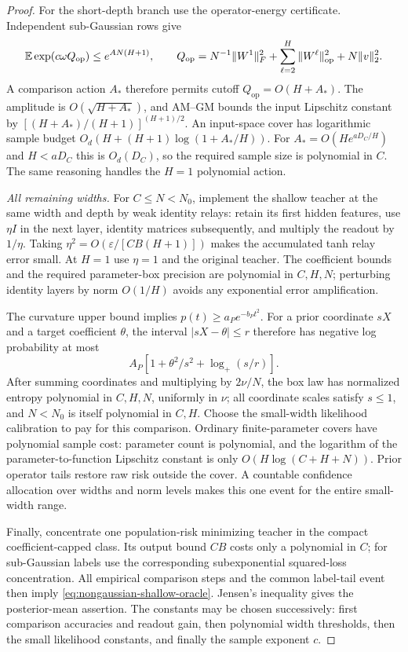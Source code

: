 \begin{proof}
For the short-depth branch use the operator-energy certificate.
Independent sub-Gaussian rows give
\[
 \mathbb E\exp(c\omega Q_{\mathrm{op}})\le e^{AN(H+1)},\qquad
 Q_{\mathrm{op}}=N^{-1}\|W^1\|_F^2
     +\sum_{\ell=2}^H\|W^\ell\|_{\mathrm{op}}^2
     +N\|v\|_2^2.
\]
A comparison action $A_*$ therefore permits cutoff
$Q_{\mathrm{op}}=O(H+A_*)$.
The amplitude is $O(\sqrt{H+A_*})$, and AM--GM bounds the input
Lipschitz constant by
$[(H+A_*)/(H+1)]^{(H+1)/2}$.
An input-space cover has logarithmic sample budget
$O_d(H+(H+1)\log(1+A_*/H))$.
For $A_*=O(H e^{aD_C/H})$ and $H<aD_C$ this is $O_d(D_C)$,
so the required sample size is polynomial in $C$. The same reasoning
handles the $H=1$ polynomial action.

\emph{All remaining widths.}
For $C\le N<N_0$, implement the shallow teacher at the same width
and depth by weak identity relays: retain its first hidden features,
use $\eta I$ in the next layer, identity matrices subsequently, and
multiply the readout by $1/\eta$. Taking
$\eta^2=O(\varepsilon/[CB(H+1)])$ makes the accumulated tanh relay
error small. At $H=1$ use $\eta=1$ and the original teacher.
The coefficient bounds and the required parameter-box precision are
polynomial in $C,H,N$; perturbing identity layers by norm
$O(1/H)$ avoids any exponential error amplification.

The curvature upper bound implies $p(t)\ge a_Pe^{-b_Pt^2}$.
For a prior coordinate $sX$ and a target coefficient $\theta$, the
interval $|sX-\theta|\le r$ therefore has negative log probability
at most
\[
 A_P[1+\theta^2/s^2+\log_+(s/r)].
\]
After summing coordinates and multiplying by $2\nu/N$, the box law
has normalized entropy polynomial in $C,H,N$, uniformly in $\nu$;
all coordinate scales satisfy $s\le1$, and $N<N_0$ is itself
polynomial in $C,H$. Choose the small-width likelihood calibration
to pay for this comparison. Ordinary finite-parameter covers have
polynomial sample cost: parameter count is polynomial, and the
logarithm of the parameter-to-function Lipschitz constant is only
$O(H\log(C+H+N))$. Prior operator tails restore raw risk outside the
cover. A countable confidence allocation over widths and norm levels
makes this one event for the entire small-width range.

Finally, concentrate one population-risk minimizing teacher in the
compact coefficient-capped class. Its output bound $CB$ costs only a
polynomial in $C$; for sub-Gaussian labels use the corresponding
subexponential squared-loss concentration. All empirical comparison
steps and the common label-tail event then imply
\eqref{eq:nongaussian-shallow-oracle}. Jensen's inequality gives the
posterior-mean assertion. The constants may be chosen successively:
first comparison accuracies and readout gain, then polynomial width
thresholds, then the small likelihood constants, and finally the
sample exponent $c$.
\end{proof}
